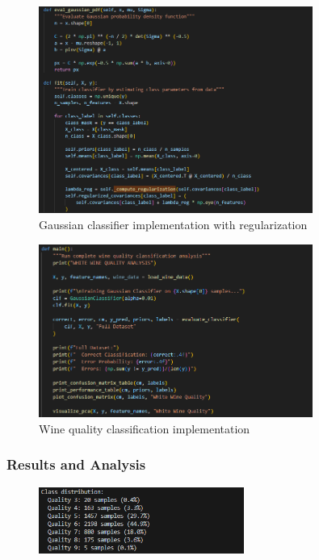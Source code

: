\documentclass[12pt]{article}
\begin{document}
\begin{figure}[H]
    \centering
    \includegraphics[width=0.8\textwidth]{gaussian_classifier_code.png}
    \caption{Gaussian classifier implementation with regularization}
\end{figure}

\begin{figure}[H]
    \centering
    \includegraphics[width=0.8\textwidth]{wine_main_implementation.png}
    \caption{Wine quality classification implementation}
\end{figure}

\subsubsection{Results and Analysis}

\begin{figure}[H]
    \centering
    \includegraphics[width=0.6\textwidth]{wine_class_distribution.png}
\end{figure}
\end{document}

